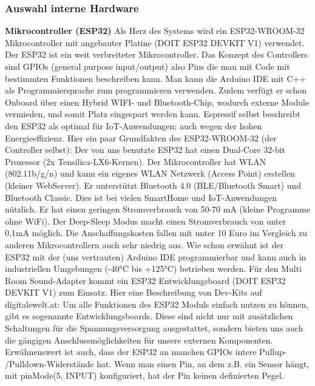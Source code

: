 \documentclass[11pt, twoside]{article}
\begin{document}
\subsubsection{Auswahl interne Hardware}
\textbf{Mikrocontroller (ESP32)}\newline
Als Herz des Systems wird ein ESP32-WROOM-32 Mikrocontroller mit angebauter Platine (DOIT ESP32 DEVKIT V1) verwendet. Der ESP32 ist ein weit verbreiteter Mikrocontroller. Das Konzept des Controllers sind GPIOs (general purpose input/output) also Pins die man mit Code mit bestimmten Funktionen beschreiben kann. Man kann die Arduino IDE mit C++ als Programmiersprache zum programmieren verwenden. Zudem verfügt er schon Onboard über einen Hybrid WIFI- und Bluetooth-Chip, wodurch externe Module vermieden, und somit Platz eingespart werden kann. Espressif selbst beschreibt den ESP32 als optimal für IoT-Anwendungen; auch wegen der hohen Energieeffizienz.\newline
Hier ein paar Grundfakten des ESP32-WROOM-32 (der Controller selbst):\newline
Der von uns benutzte ESP32 hat einen Dual-Core 32-bit Prozessor (2x Tensilica-LX6-Kernen). Der Mikrocontroller hat WLAN (802.11b/g/n) und kann ein eigenes WLAN Netzwerk (Access Point) erstellen (kleiner WebServer). Er unterstützt Bluetooth 4.0 (BLE/Bluetooth Smart) und Bluetooth Classic. Dies ist bei vielen SmartHome und IoT-Anwendungen nützlich. Er hat einen geringen Stromverbrauch von 50-70 mA (kleine Programme ohne WiFi). Der Deep-Sleep Modus macht einen Stromverbrauch von unter 0,1mA möglich. Die Anschaffungskosten fallen mit unter 10 Euro im Vergleich zu anderen Mikrocontrollern auch sehr niedrig aus.\newline
Wie schon erwähnt ist der ESP32 mit der (uns vertrauten) Arduino IDE programmierbar und kann auch in industriellen Umgebungen (-40°C bis +125°C) betrieben werden.\newline
Für den Multi Room Sound-Adapter kommt ein ESP32 Entwicklungsboard (DOIT ESP32 DEVKIT V1) zum Einsatz.\newline
Hier eine Beschreibung von Dev-Kits auf digitalewelt.at: \glqq Um alle Funktionen des ESP32 Moduls einfach nutzen zu können, gibt es sogenannte Entwicklungsboards. Diese sind nicht nur mit zusätzlichen Schaltungen für die Spannungsversorgung ausgestattet, sondern bieten uns auch die gängigen Anschlussmöglichkeiten für unsere externen Komponenten.\grqq{} \newline
Erwähnenswert ist auch, dass der ESP32 an manchen GPIOs intere Pullup- /Pulldown-Widerstände hat. \glqq Wenn man einen Pin, an dem z.B. ein Sensor hängt, mit pinMode(5, INPUT) konfiguriert, hat der Pin keinen definierten Pegel.
\end{document}
